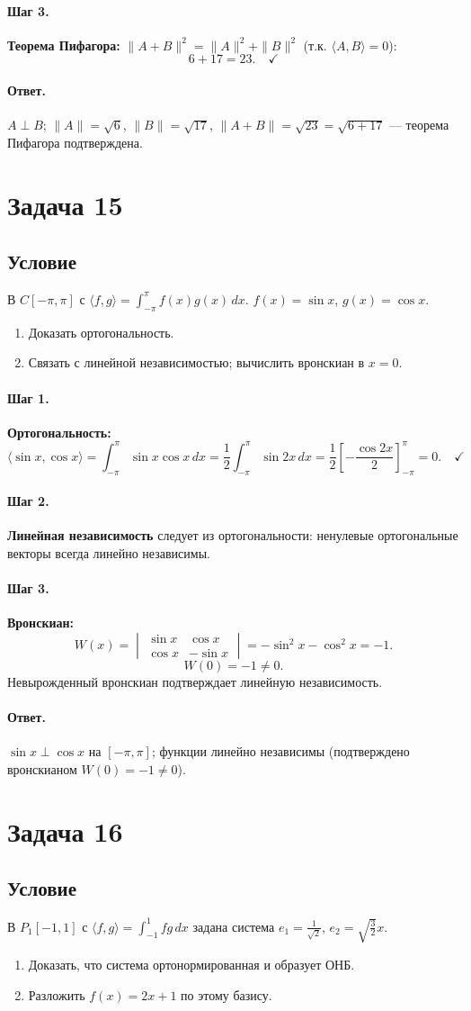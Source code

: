 \documentclass[12pt,a4paper]{article}
\theoremstyle{solution}
\newcommand{\task}[1]{\newpage\section*{Задача #1}}
\newcommand{\answer}{\paragraph{Ответ.}}
\newcommand{\step}[1]{\paragraph{Шаг #1.}}
\begin{document}
\step{3} \textbf{Теорема Пифагора:} $\|A+B\|^2=\|A\|^2+\|B\|^2$ (т.к. $\langle A,B\rangle=0$):
\[
6+17=23.\quad\checkmark
\]

\answer $A\perp B$; $\|A\|=\sqrt{6}$, $\|B\|=\sqrt{17}$, $\|A+B\|=\sqrt{23}=\sqrt{6+17}$ --- теорема Пифагора подтверждена.

\task{15}
\subsection*{Условие}
В $C[-\pi,\pi]$ с $\langle f,g\rangle=\int_{-\pi}^{\pi}f(x)g(x)\,dx$. $f(x)=\sin x$, $g(x)=\cos x$.
\begin{enumerate}
\item Доказать ортогональность.
\item Связать с линейной независимостью; вычислить вронскиан в $x=0$.
\end{enumerate}

\step{1} \textbf{Ортогональность:}
\[
\langle\sin x,\cos x\rangle=\int_{-\pi}^{\pi}\sin x\cos x\,dx
=\frac{1}{2}\int_{-\pi}^{\pi}\sin 2x\,dx
=\frac{1}{2}\left[-\frac{\cos 2x}{2}\right]_{-\pi}^{\pi}=0.\quad\checkmark
\]

\step{2} \textbf{Линейная независимость} следует из ортогональности: ненулевые ортогональные векторы всегда линейно независимы.

\step{3} \textbf{Вронскиан:}
\[
W(x)=\begin{vmatrix}\sin x&\cos x\\\cos x&-\sin x\end{vmatrix}=-\sin^2x-\cos^2x=-1.
\]
\[
W(0)=-1\neq0.
\]
Невырожденный вронскиан подтверждает линейную независимость.

\answer $\sin x\perp\cos x$ на $[-\pi,\pi]$; функции линейно независимы (подтверждено вронскианом $W(0)=-1\neq0$).

\task{16}
\subsection*{Условие}
В $P_1[-1,1]$ с $\langle f,g\rangle=\int_{-1}^1 fg\,dx$ задана система $e_1=\frac{1}{\sqrt{2}}$, $e_2=\sqrt{\frac{3}{2}}x$.
\begin{enumerate}
\item Доказать, что система ортонормированная и образует ОНБ.
\item Разложить $f(x)=2x+1$ по этому базису.
\end{enumerate}
\end{document}

